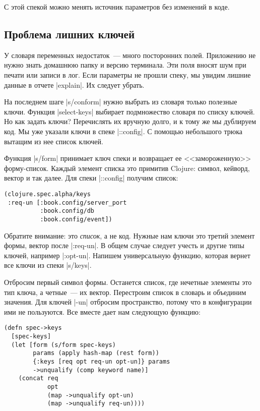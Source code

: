 С этой спекой можно менять источник параметров без изменений в коде.

\subsection{Проблема лишних ключей}

У словаря переменных недостаток~--- много посторонних полей. Приложению не нужно
знать домашнюю папку и версию терминала. Эти поля вносят шум при печати или
записи в лог. Если параметры не прошли спеку, мы увидим лишние данные в отчете
\spverb|explain|. Их следует убрать.

На последнем шаге \spverb|s/conform| нужно выбрать из словаря только полезные
ключи. Функция \spverb|select-keys| выбирает подмножество словаря по списку
ключей. Но как задать ключи? Перечислять их вручную долго, и к тому же мы
дублируем код. Мы уже указали ключи в спеке \spverb|::config|. С помощью
небольшого трюка вытащим из нее список ключей.

Функция \spverb|s/form| принимает ключ спеки и возвращает ее <<замороженную>>
форму-список. Каждый элемент списка это примитив Clojure: символ, кейворд,
вектор и так далее. Для спеки \spverb|::config| получим список:

\begin{verbatim}
(clojure.spec.alpha/keys
 :req-un [:book.config/server_port
          :book.config/db
          :book.config/event])
\end{verbatim}

Обратите внимание: это \emph{список}, а не код. Нужные нам ключи это третий
элемент формы, вектор после \spverb|:req-un|. В общем случае следует учесть и
другие типы ключей, например \spverb|:opt-un|. Напишем универсальную функцию,
которая вернет все ключи из спеки \spverb|s/keys|.

Отбросим первый символ формы. Останется список, где нечетные элементы это тип
ключа, а четные~--- их вектор. Перестроим список в словарь и объединим
значения. Для ключей \spverb|-un| отбросим пространство, потому что в
конфигурации ими не пользуются. Все вместе дает нам следующую функцию:

\begin{verbatim}
(defn spec->keys
  [spec-keys]
  (let [form (s/form spec-keys)
        params (apply hash-map (rest form))
        {:keys [req opt req-un opt-un]} params
        ->unqualify (comp keyword name)]
    (concat req
            opt
            (map ->unqualify opt-un)
            (map ->unqualify req-un))))
\end{verbatim}

